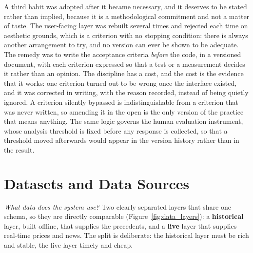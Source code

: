 A third habit was adopted after it became necessary, and it deserves to be stated rather than implied,
because it is a methodological commitment and not a matter of taste. The user-facing layer was rebuilt
several times and rejected each time on aesthetic grounds, which is a criterion with no stopping
condition: there is always another arrangement to try, and no version can ever be shown to be adequate.
The remedy was to write the acceptance criteria \emph{before} the code, in a versioned document, with
each criterion expressed so that a test or a measurement decides it rather than an opinion. The
discipline has a cost, and the cost is the evidence that it works: one criterion turned out to be wrong
once the interface existed, and it was corrected in writing, with the reason recorded, instead of being
quietly ignored. A criterion silently bypassed is indistinguishable from a criterion that was never
written, so amending it in the open is the only version of the practice that means anything. The same
logic governs the human evaluation instrument, whose analysis threshold is fixed before any response is
collected, so that a threshold moved afterwards would appear in the version history rather than in the
result.

\section{Datasets and Data Sources}
\label{sec:met_data}

\emph{What data does the system use?} Two clearly separated layers that share one schema, so they are
directly comparable (Figure~\ref{fig:data_layers}): a \textbf{historical} layer, built offline, that
supplies the precedents, and a \textbf{live} layer that supplies real-time prices and news. The split is
deliberate: the historical layer must be rich and stable, the live layer timely and cheap.

